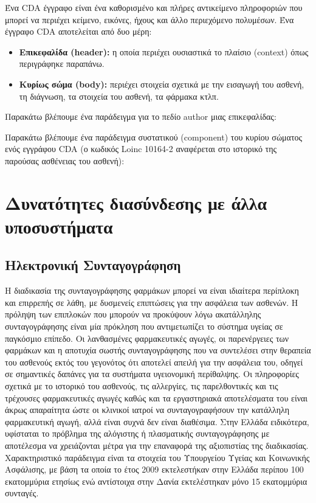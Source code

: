 	Ένα CDA έγγραφο είναι ένα καθορισμένο και πλήρες αντικείμενο πληροφοριών που μπορεί να περιέχει κείμενο, εικόνες, ήχους και άλλο περιεχόμενο πολυμέσων. Ένα έγγραφο CDA αποτελείται από δυο μέρη:
	\begin{itemize}
		\item \textbf{Επικεφαλίδα (header): } η οποία περιέχει ουσιαστικά το πλαίσιο (context) όπως περιγράφηκε παραπάνω.
		\item \textbf{Κυρίως σώμα (body): } περιέχει στοιχεία σχετικά με την εισαγωγή του ασθενή, τη διάγνωση, τα στοιχεία του ασθενή, τα φάρμακα κτλπ.
	\end{itemize}
	
	Παρακάτω βλέπουμε ένα παράδειγμα για το πεδίο author μιας επικεφαλίδας:
	
	Παρακάτω βλέπουμε ένα παράδειγμα συστατικού (component) του κυρίου σώματος ενός εγγράφου CDA (ο κωδικός Loinc 10164-2 αναφέρεται στο ιστορικό της παρούσας ασθένειας του ασθενή):
	
		
\section{Δυνατότητες διασύνδεσης με άλλα υποσυστήματα}

	\subsection{Ηλεκτρονική Συνταγογράφηση}
	
		Η διαδικασία της συνταγογράφησης φαρμάκων μπορεί να είναι ιδιαίτερα περίπλοκη και επιρρεπής σε λάθη, με
δυσμενείς επιπτώσεις για την ασφάλεια των ασθενών. Η πρόληψη των επιπλοκών που μπορούν να προκύψουν λόγω ακατάλληλης συνταγογράφησης είναι μία πρόκληση που αντιμετωπίζει το σύστημα υγείας σε παγκόσμιο επίπεδο. Οι λανθασμένες φαρμακευτικές αγωγές, οι παρενέργειες των φαρμάκων και η αποτυχία σωστής συνταγογράφησης που να συντελέσει στην θεραπεία του ασθενούς εκτός του γεγονότος ότι αποτελεί απειλή για την ασφάλεια του, οδηγεί σε σημαντικές δαπάνες για τα συστήματα υγειονομική περίθαλψης. Οι πληροφορίες σχετικά με το ιστορικό του ασθενούς, τις αλλεργίες, τις παρελθοντικές και τις τρέχουσες φαρμακευτικές αγωγές καθώς και τα εργαστηριακά αποτελέσματα του είναι άκρως απαραίτητα ώστε οι κλινικοί ιατροί να συνταγογραφήσουν την κατάλληλη φαρμακευτική αγωγή, αλλά είναι συχνά δεν είναι διαθέσιμα. \cite{prescribingErrors} Στην Ελλάδα ειδικότερα, υφίσταται το πρόβλημα της αλόγιστης ή πλασματικής συνταγογράφησης με αποτέλεσμα να  χρειάζονται μέτρα για την επαναφορά της αξιοπιστίας της διαδικασίας.  Χαρακτηριστικό παράδειγμα είναι τα στοιχεία του Υπουργείου Υγείας και Κοινωνικής Ασφάλισης, με βάση τα οποία το έτος 2009 εκτελεστήκαν στην Ελλάδα περίπου 100 εκατομμύρια ετησίως ενώ αντίστοιχα στην Δανία εκτελέστηκαν μόνο 15 εκατομμύρια συνταγές.



